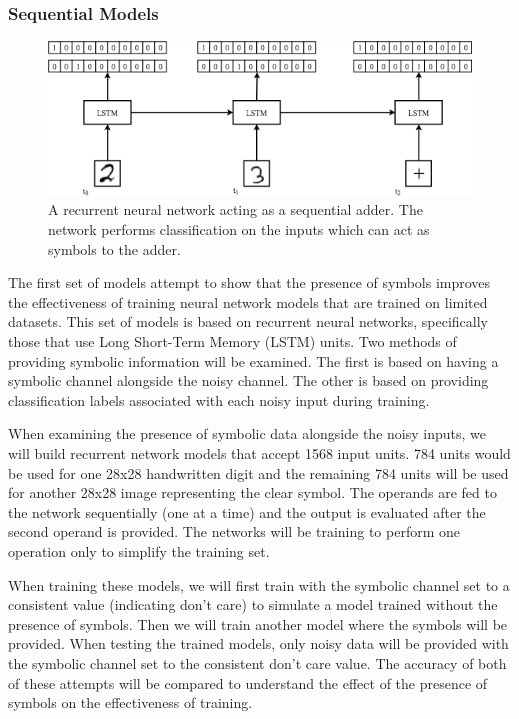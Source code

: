\documentclass{article}
\begin{document}
	\subsubsection{Sequential Models}
	
	\begin{figure}
		\centering
		\includegraphics[max width=\textwidth]{sequential-model}
		\caption{A recurrent neural network acting as a sequential adder. The network performs classification on the inputs which can act as symbols to the adder.}
		\label{fig:sequential-model}
	\end{figure}
	
	The first set of models attempt to show that the presence of symbols improves the effectiveness of training neural network models that are trained on limited datasets. This set of models is based on recurrent neural networks, specifically those that use Long Short-Term Memory (LSTM) units. Two methods of providing symbolic information will be examined. The first is based on having a symbolic channel alongside the noisy channel. The other is based on providing classification labels associated with each noisy input during training.
	
	When examining the presence of symbolic data alongside the noisy inputs, we will build recurrent network models that accept 1568 input units. 784 units would be used for one 28x28 handwritten digit and the remaining 784 units will be used for another 28x28 image representing the clear symbol. The operands are fed to the network sequentially (one at a time) and the output is evaluated after the second operand is provided. The networks will be training to perform one operation only to simplify the training set.
	
	When training these models, we will first train with the symbolic channel set to a consistent value (indicating don't care) to simulate a model trained without the presence of symbols. Then we will train another model where the symbols will be provided. When testing the trained models, only noisy data will be provided with the symbolic channel set to the consistent don't care value. The accuracy of both of these attempts will be compared to understand the effect of the presence of symbols on the effectiveness of training.
	
\end{document}
